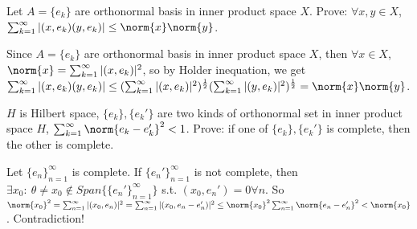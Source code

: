 \documentclass{ctexart}
\newif\ifpreface
\begin{document}
\large
\setlength{\baselineskip}{1.2em}
\ifpreface
    
\else
\maketitle
\fi
{}
\begin{problem}
    Let $A=\{e_k\}$ are orthonormal basis in inner product space $X$. Prove: $\forall x,y\in X$, $\sum_{k=1}^{\infty}|(x,e_k)(y,e_k)|\leq \norm{x}\norm{y}$.
\end{problem}
\begin{solution}
    Since $A=\{e_k\}$ are orthonormal basis in inner product space $X$, then $\forall x\in X$, $\norm{x}=\sum_{k=1}^{\infty}|(x,e_k)|^2$, so by Holder inequation, we get $\sum_{k=1}^{\infty}|(x,e_k)(y,e_k)|\leq (\sum_{k=1}^{\infty}|(x,e_k)|^2)^{\frac{1}{2}}(\sum_{k=1}^{\infty}|(y,e_k)|^2)^{\frac{1}{2}}=\norm{x}\norm{y}$.
\end{solution}

\begin{problem}
    $H$ is Hilbert space, $\{e_k\},\{e_k'\}$ are two kinds of orthonormal set in inner product space $H$, $\sum_{k=1}^{\infty}\norm{e_k-e_k'}^2<1$. Prove: if one of $\{e_k\},\{e_k'\}$ is complete, then the other is complete.
\end{problem}
\begin{solution}
    Let $\{e_n\}_{n=1}^{\infty}$ is complete. If $\{e_n'\}_{n=1}^{\infty}$ is not complete, then $\exists x_0:\ \theta\neq x_0\notin Span\{\{e_n'\}_{n=1}^{\infty}\}$ s.t. $(x_0,e_n')=0\forall n$. So $\norm{x_0}^2=\sum_{n=1}^{\infty}|(x_0,e_n)|^2=\sum_{n=1}^{\infty}|(x_0,e_n-e_n')|^2\leq\norm{x_0}^2\sum_{n=1}^{\infty}\norm{e_n-e_n'}^2<\norm{x_0}$. Contradiction!
\end{solution}
\end{document}
